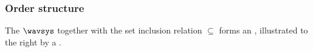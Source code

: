 


\subsubsection{Order structure}

\begin{minipage}{\tw-70mm}\raggedright
The  $\wavsys$  together with the 
set inclusion relation $\subseteq$ 
forms an , 
illustrated to the right by a .%
\end{minipage}%
\hfill%
\begin{minipage}{60mm}%
\end{minipage}%


